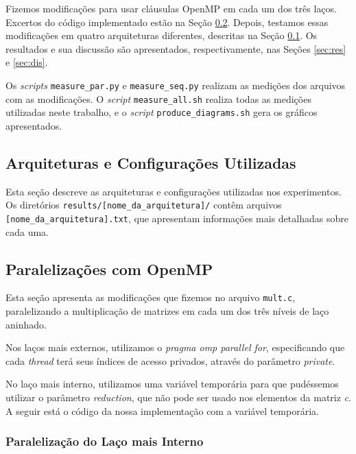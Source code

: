 \documentclass[a4paper, 12pt]{article}
\begin{document}
Fizemos modificações para usar cláusulas OpenMP em cada um dos três laços.
Excertos do código implementado estão na Seção \ref{sec:code}. Depois,
testamos essas modificações em quatro arquiteturas diferentes, descritas
na Seção \ref{sec:arch}. Os resultados e sua discussão são apresentados,
respectivamente, nas Seções \ref{sec:res} e \ref{sec:dis}.

Os \textit{scripts} \texttt{measure\_par.py} e \texttt{measure\_seq.py}
realizam as medições dos arquivos com as modificações. O \textit{script}
\texttt{measure\_all.sh} realiza todas as medições utilizadas neste trabalho,
e o \textit{script} \texttt{produce\_diagrams.sh} gera os gráficos
apresentados.

\subsection{Arquiteturas e Configurações Utilizadas} \label{sec:arch}

Esta seção descreve as arquiteturas e configurações utilizadas nos experimentos.
Os diretórios \texttt{results/[nome\_da\_arquitetura]/} contêm arquivos
\texttt{[nome\_da\_arquitetura].txt}, que apresentam informações mais
detalhadas sobre cada uma.



\subsection{Paralelizações com OpenMP} \label{sec:code}

Esta seção apresenta as modificações que fizemos no arquivo
\texttt{mult.c}, paralelizando a multiplicação de matrizes
em cada um dos três níveis de laço aninhado.

Nos laços mais externos, utilizamos o \textit{pragma omp parallel for},
especificando que cada \textit{thread} terá seus índices de
acesso privados, através do parâmetro \textit{private}.

No laço mais interno, utilizamos uma variável temporária para que pudéssemos
utilizar o parâmetro \textit{reduction}, que não pode ser usado nos elementos
da matriz \textit{c}. A seguir está o código da nossa implementação com a
variável temporária.

\subsubsection{Paralelização do Laço mais Interno}
\end{document}
